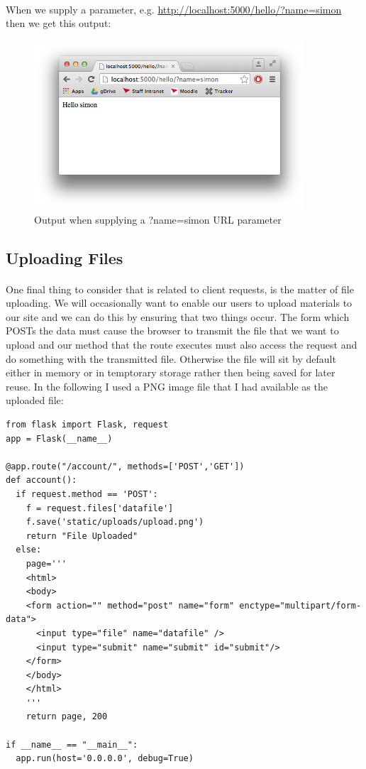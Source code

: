 \documentclass[12pt, a4paper, twoside]{book}
\begin{document}
\paragraph{} When we supply a parameter, e.g. \url{http://localhost:5000/hello/?name=simon} then we get this output:

\begin{figure}[H]
\centering
\includegraphics[width=0.9\textwidth]{images/flask-url-param-name.png}
\caption{Output when supplying a ?name=simon URL parameter}
\label{fig:flask-url-param-name}
\end{figure}


\subsection{Uploading Files}
\label{file-uploading}
\paragraph{} One final thing to consider that is related to client requests, is the matter of file uploading. We will occasionally want to enable our users to upload materials to our site and we can do this by ensuring that two things occur. The form which POSTs the data must cause the browser to transmit the file that we want to upload and our method that the route executes must also access the request and do something with the transmitted file. Otherwise the file will sit by default either in memory or in temptorary storage rather then being saved for later reuse. In the following I used a PNG image file that I had available as the uploaded file:

\begin{lstlisting}
from flask import Flask, request
app = Flask(__name__)

@app.route("/account/", methods=['POST','GET'])
def account():
  if request.method == 'POST':
    f = request.files['datafile']
    f.save('static/uploads/upload.png')
    return "File Uploaded"
  else:
    page='''
    <html>
    <body>
    <form action="" method="post" name="form" enctype="multipart/form-data">
      <input type="file" name="datafile" />
      <input type="submit" name="submit" id="submit"/>
    </form>
    </body>
    </html>
    '''
    return page, 200

if __name__ == "__main__":
  app.run(host='0.0.0.0', debug=True)
\end{lstlisting}
\end{document}
